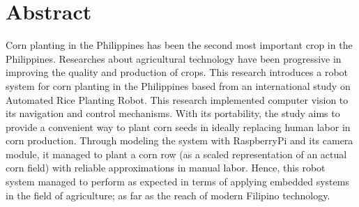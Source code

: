 \chapter*{Abstract}

Corn planting in the Philippines has been the second most important crop in the Philippines. Researches about agricultural technology have been progressive in improving the quality and production of crops. This research introduces a robot system for corn planting in the Philippines based from an international study on Automated Rice Planting Robot. This research implemented computer vision to its navigation and control mechanisms. With its portability, the study aims to provide a convenient way to plant corn seeds in ideally replacing human labor in corn production. Through modeling the system with RaspberryPi and its camera module, it managed to plant a corn row (as a scaled representation of an actual corn field) with reliable approximations in manual labor. Hence, this robot system managed to perform as expected in terms of applying embedded systems in the field of agriculture; as far as the reach of modern Filipino technology.


